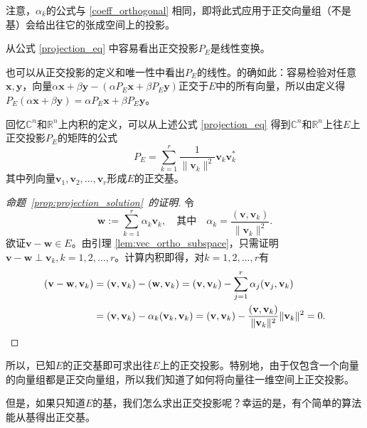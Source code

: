 注意，$\alpha_k$的公式与 \eqref{coeff_orthogonal} 相同，即将此式应用于正交向量组（不是基）会给出往它的张成空间上的投影。

\begin{remark}
    从公式 \eqref{projection_eq} 中容易看出正交投影$P_E$是线性变换。

    也可以从正交投影的定义和唯一性中看出$P_E$的线性。的确如此：容易检验对任意$\mathbf{x},\mathbf{y}$，向量$\alpha\mathbf{x}+\beta\mathbf{y}-(\alpha P_{E}\mathbf{x}+\beta P_{E}\mathbf{y})$正交于$E$中的所有向量，所以由定义得$P_{E}(\alpha\mathbf{x}+\beta\mathbf{y})=\alpha P_{E}\mathbf{x}+\beta P_{E}\mathbf{y}$。
\end{remark}

\begin{remark}
    回忆$\mathbb{C}^n$和$\mathbb{R}^n$上内积的定义，可以从上述公式 \eqref{projection_eq} 得到$\mathbb{C}^n$和$\mathbb{R}^n$上往$E$上正交投影$P_E$的矩阵的公式
    \begin{equation}\label{proj_matrix}
        P_E=\sum_{k=1}^r\frac{1}{\|\mathbf{v}_k\|^2}\mathbf{v}_k\mathbf{v}_k^*
    \end{equation}
    其中列向量$\mathbf{v}_{1},\mathbf{v}_{2},\ldots,\mathbf{v}_{r}$形成$E$的正交基。
\end{remark}
\begin{proof}[命题~\ref{prop:projection_solution}~的证明]
    令\[\mathbf{w}:=\sum_{k=1}^r\alpha_k\mathbf{v}_k,\quad \text{其中}\quad\alpha_k=\frac{(\mathbf{v},\mathbf{v}_k)}{\|\mathbf{v}_k\|^2}.\]
    欲证$\mathbf{v}-\mathbf{w}\in E$。由引理 \ref{lem:vec_ortho_subspace}，只需证明$\mathbf{v}-\mathbf{w}\perp \mathbf{v}_k,k=1,2,\dots,r$。计算内积即得，对$k=1,2,\dots,r$有
    \begin{align*}
        (\mathbf{v-w},\mathbf{v}_{k})&=(\mathbf{v},\mathbf{v}_{k})-(\mathbf{w},\mathbf{v}_{k})=(\mathbf{v},\mathbf{v}_{k})-\sum_{j=1}^{r}\alpha_{j}(\mathbf{v}_{j},\mathbf{v}_{k})\\
        &=(\mathbf{v},\mathbf{v}_{k})-\alpha_{k}(\mathbf{v}_{k},\mathbf{v}_{k})=(\mathbf{v},\mathbf{v}_{k})-\frac{(\mathbf{v},\mathbf{v}_{k})}{\|\mathbf{v}_{k}\|^{2}}\|\mathbf{v}_{k}\|^{2}=0.\qedhere
    \end{align*}
\end{proof}

所以，已知$E$的正交基即可求出往$E$上的正交投影。特别地，由于仅包含一个向量的向量组都是正交向量组，所以我们知道了如何将向量往一维空间上正交投影。

但是，如果只知道$E$的基，我们怎么求出正交投影呢？幸运的是，有个简单的算法能从基得出正交基。

